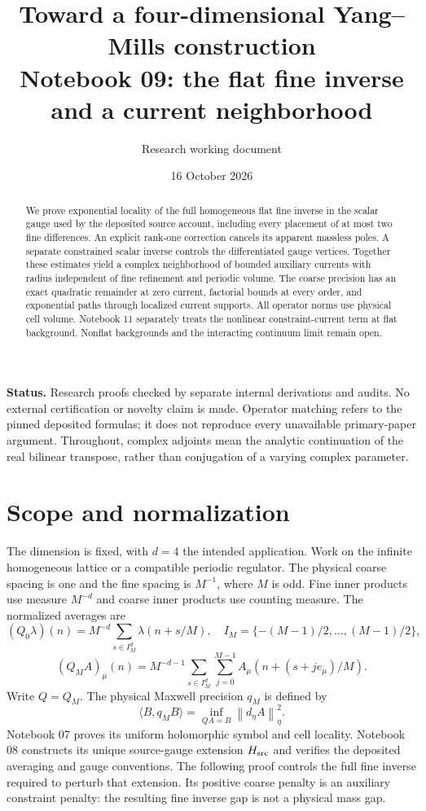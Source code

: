 \documentclass[11pt]{article}
\title{Toward a four-dimensional Yang--Mills construction\\
\large Notebook 09: the flat fine inverse and a current neighborhood}
\author{Research working document}
\date{16 October 2026}
\theoremstyle{remark}
\newcommand{\norm}[1]{\left\|#1\right\|}
\begin{document}
\maketitle

\begin{abstract}
We prove exponential locality of the full homogeneous flat fine
inverse in the scalar gauge used by the deposited source account,
including every placement of at most two fine differences. An explicit
rank-one correction cancels its apparent massless poles. A separate
constrained scalar inverse controls the differentiated gauge vertices.
Together these estimates yield a complex neighborhood of bounded
auxiliary currents with radius independent of fine refinement and
periodic volume. The coarse precision has an exact quadratic remainder
at zero current, factorial bounds at every order, and exponential
paths through localized current supports. All operator norms use
physical cell volume. Notebook 11 separately treats the nonlinear
constraint-current term at flat background. Nonflat backgrounds and
the interacting continuum limit remain open.
\end{abstract}

\noindent\textbf{Status.}
Research proofs checked by separate internal derivations and audits.
No external certification or novelty claim is made. Operator matching
refers to the pinned deposited formulas; it does not reproduce every
unavailable primary-paper argument. Throughout, complex adjoints mean
the analytic continuation of the real bilinear transpose, rather than
conjugation of a varying complex parameter.

\section{Scope and normalization}

The dimension is fixed, with $d=4$ the intended application. Work on
the infinite homogeneous lattice or a compatible periodic regulator.
The physical coarse spacing is one and the fine spacing is $M^{-1}$,
where $M$ is odd. Fine inner products use measure $M^{-d}$ and coarse
inner products use counting measure. The normalized averages are
\[
 (Q_0\lambda)(n)=M^{-d}\sum_{s\in I_M^d}\lambda(n+s/M),
 \quad I_M=\{-(M-1)/2,\ldots,(M-1)/2\},
\]
\[
 (Q_M A)_\mu(n)=M^{-d-1}\sum_{s\in I_M^d}\sum_{j=0}^{M-1}
 A_\mu(n+(s+je_\mu)/M).
\]
Write $Q=Q_M$. The physical Maxwell precision $q_M$ is defined by
\[
 \langle B,q_MB\rangle=\inf_{QA=B}\norm{d_\eta A}_\eta^2.
\]
Notebook 07 proves its uniform holomorphic symbol and cell locality.
Notebook 08 constructs its unique source-gauge extension $H_{\rm src}$
and verifies the deposited averaging and gauge conventions. The
following proof controls the full fine inverse required to perturb
that extension. Its positive coarse penalty is an auxiliary constraint
penalty: the resulting fine inverse gap is not a physical mass gap.
\end{document}
